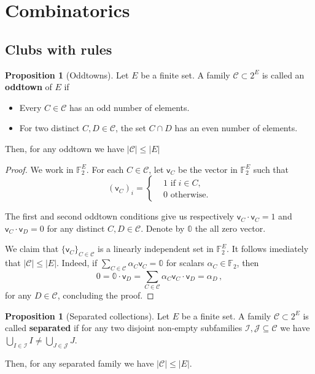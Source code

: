 \documentclass[12pt]{amsart}
\theoremstyle{definition}
\newtheorem{prop}[thm]{Proposition}
\newcommand{\F}{\mathbb{F}}
\newcommand{\CC}{\mathcal C}
\newcommand{\JJ}{\mathcal J}
\newcommand{\II}{\mathcal I}
\newcommand{\vv}{\mathsf{v}}
\begin{document}
\section{Combinatorics}

\subsection{Clubs with rules}


\begin{prop}[Oddtowns]\label{prop:oddtown}
Let $E$ be a finite set.
A family $\CC \subset 2^E $ is called an \textbf{oddtown} of $E$ if
\begin{itemize}
\item Every $C \in \CC $ has an odd number of elements.

\item For two distinct $C, D \in \CC$, the set $C\cap D$ has an even number of elements.
\end{itemize}

Then, for any oddtown we have $|\CC| \leq |E|$
\end{prop}


\begin{proof}
We work in $\F_2^E$.
For each $C \in \CC$, let $\vv_C$ be the vector in $\F_2^E$ such that 
$$ (\vv_C)_i =\begin{cases*}
      & 1 \text{ if $i \in C$,}\\
      & 0 \text{ otherwise.}
    \end{cases*} $$

The first and second oddtown conditions give us respectively $\vv_C \cdot \vv_C = 1$ and $\vv_C \cdot \vv_D = 0 $ for any distinct $C, D \in \CC$.
Denote by $\mathbb{0}$ the all zero vector.

We claim that $\{\vv_C\}_{C \in \CC}$ is a linearly independent set in $\F_2^E$.
It follows imediately that $|\CC| \leq |E|$.
Indeed, if $\sum_{C \in \CC} \alpha_C \vv_C = \mathbb{0}$ for scalars $\alpha_C \in \F_2$, then
$$ 0 = \mathbb{0} \cdot \vv_D = \sum_{C \in \CC} \alpha_C \vv_C\cdot \vv_D = \alpha_D\, ,$$
for any $D \in \CC$, concluding the proof.
\end{proof}


\begin{prop}[Separated collections]
Let $E$ be a finite set.
A family $\CC \subset 2^E $ is called \textbf{separated} if for any two disjoint non-empty subfamilies $\II, \JJ \subseteq \CC$ we have $\bigcup_{I\in\II} I \neq \bigcup_{J\in\JJ} J$.

Then, for any separated family we have $|\CC| \leq |E|$.
\end{prop}
\end{document}
